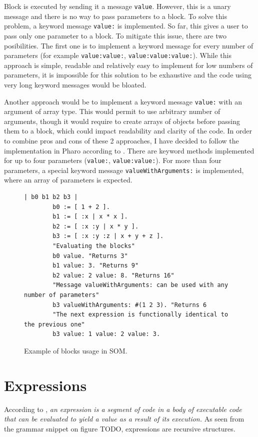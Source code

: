 \documentclass[thesis=M,english]{FITthesis}[2019/12/23]
\begin{document}
Block is executed by sending it a message \texttt{value}. However, this is a unary message and there is no way
to pass parameters to a block. To solve this problem, a keyword message \texttt{value:} is implemented. So far, this
gives a user to pass only one parameter to a block. To mitigate this issue, there are two posibilities. The first one
is to implement a keyword message for every number of parameters (for example \texttt{value:value:}, 
\texttt{value:value:value:}). While this approach is simple, readable and relatively easy to implement for low
numbers of parameters, it is impossible for this solution to be exhaustive and the code using very long keyword
messages would be bloated.

Another approach would be to implement a keyword message \texttt{value:} with an argument of array type. This would
permit to use arbitrary number of arguments, though it would require to create arrays of objects before passing them
to a block, which could impact readability and clarity of the code. In order to combine pros and cons of these 2
approaches, I have decided to follow the implementation in Pharo according to \cite[p.~65]{pharo-by-example}. 
There are keyword methods implemented for up to four parameters (\texttt{value:}, \texttt{value:value:}). For more
than four parameters, a special keyword message \texttt{valueWithArguments:} is implemented, where an array of
parameters is expected.

\begin{figure}
	\caption{Example of blocks usage in SOM.}
	\begin{lstlisting}[language=Smalltalk]
		| b0 b1 b2 b3 |
		b0 := [ 1 + 2 ].
		b1 := [ :x | x * x ].
		b2 := [ :x :y | x * y ].
		b3 := [ :x :y :z | x + y + z ].
		"Evaluating the blocks"
		b0 value. "Returns 3"
		b1 value: 3. "Returns 9"
		b2 value: 2 value: 8. "Returns 16"
		"Message valueWithArguments: can be used with any number of parameters"
		b3 valueWithArguments: #(1 2 3). "Returns 6
		"The next expression is functionally identical to the previous one"
		b3 value: 1 value: 2 value: 3.
	\end{lstlisting}
\end{figure}

\section{Expressions}
According to \cite{smalltalk-essentials}, \textit{an expression is a segment of code in a body of executable code
that can be evaluated to yield a value as a result of its execution.} As seen from the grammar snippet on figure
TODO, expressions are recursive structures.
\end{document}
